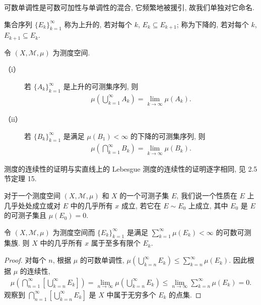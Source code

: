 \documentclass[../../main.tex]{subfiles}
\begin{document}
可数单调性是可数可加性与单调性的混合, 它频繁地被援引, 故我们单独对它命名.

集合序列 $\{E_{k}\}_{k=1}^{\infty}$ 称为上升的, 若对每个 $k$, $E_{k}\subseteq E_{k+1}$; 称为下降的, 若对每个 $k$, $E_{k+1}\subseteq E_{k}$.

\begin{proposition}[测度的连续性]\label{proposition:ch17-continuity}
令 $(X,\mathcal{M},\mu)$ 为测度空间.
\begin{description}
\item[（i）] 若 $\{A_{k}\}_{k=1}^{\infty}$ 是上升的可测集序列, 则
\begin{align}
\mu\left(\bigcup_{k=1}^{\infty}A_{k}\right)=\lim_{k\to\infty}\mu(A_{k}).\label{align:ch17-cont-up}
\end{align}
\item[（ii）] 若 $\{B_{k}\}_{k=1}^{\infty}$ 是满足 $\mu(B_{1})<\infty$ 的下降的可测集序列, 则
\begin{align}
\mu\left(\bigcap_{k=1}^{\infty}B_{k}\right)=\lim_{k\to\infty}\mu(B_{k}).\label{align:ch17-cont-down}
\end{align}
\end{description}
\end{proposition}

测度的连续性的证明与实直线上的 Lebesgue 测度的连续性的证明逐字相同, 见 2.5 节定理 15.

对于一个测度空间 $(X,\mathcal{M},\mu)$ 和 $X$ 的一个可测子集 $E$, 我们说一个性质在 $E$ 上几乎处处成立或对 $E$ 中的几乎所有 $x$ 成立, 若它在 $E\sim E_{0}$ 上成立, 其中 $E_{0}$ 是 $E$ 的可测子集且 $\mu(E_{0})=0$.

\begin{lemma}\label{lemma:ch17-borel-cantelli}
令 $(X,\mathcal{M},\mu)$ 为测度空间而 $\{E_{k}\}_{k=1}^{\infty}$ 是满足 $\sum_{k=1}^{\infty}\mu(E_{k})<\infty$ 的可数可测集族. 则 $X$ 中的几乎所有 $x$ 属于至多有限个 $E_{k}$.
\end{lemma}

\begin{proof}
对每个 $n$, 根据 $\mu$ 的可数单调性, $\mu\left(\bigcup_{k=n}^{\infty}E_{k}\right)\leqslant\sum_{k=n}^{\infty}\mu(E_{k})$. 因此根据 $\mu$ 的连续性,
\begin{align*}
\mu\left(\bigcap_{n=1}^{\infty}\left[\bigcup_{k=n}^{\infty}E_{k}\right]\right)=\lim_{n\to\infty}\mu\left(\bigcup_{k=n}^{\infty}E_{k}\right)\leqslant\lim_{n\to\infty}\sum_{k=n}^{\infty}\mu(E_{k})=0.
\end{align*}
观察到 $\bigcap_{n=1}^{\infty}\left[\bigcup_{k=n}^{\infty}E_{k}\right]$ 是 $X$ 中属于无穷多个 $E_{k}$ 的点集.
\end{proof}
\end{document}
